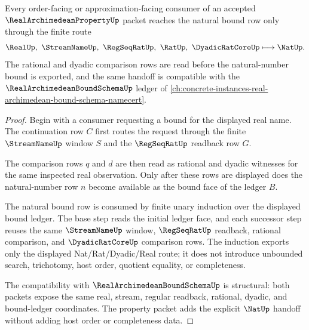 \begin{theorem}
\label{thm:real-archimedean-property-nat-rat-bound-handoff}
Every order-facing or approximation-facing consumer of an accepted $\RealArchimedeanPropertyUp$ packet reaches the natural bound row only through the finite route
$$
\RealUp,\ \StreamNameUp,\ \RegSeqRatUp,\ \RatUp,\ \DyadicRatCoreUp \longmapsto \NatUp.
$$
The rational and dyadic comparison rows are read before the natural-number bound is exported, and the same handoff is compatible with the $\RealArchimedeanBoundSchemaUp$ ledger of \autoref{ch:concrete-instances-real-archimedean-bound-schema-namecert}.
\end{theorem}
\begin{proof}
Begin with a consumer requesting a bound for the displayed real name. The continuation row $C$ first routes the request through the finite $\StreamNameUp$ window $S$ and the $\RegSeqRatUp$ readback row $G$.

The comparison rows $q$ and $d$ are then read as rational and dyadic witnesses for the same inspected real observation. Only after these rows are displayed does the natural-number row $n$ become available as the bound face of the ledger $B$.

The natural bound row is consumed by finite unary induction over the displayed bound ledger. The base step reads the initial ledger face, and each successor step reuses the same $\StreamNameUp$ window, $\RegSeqRatUp$ readback, rational comparison, and $\DyadicRatCoreUp$ comparison rows. The induction exports only the displayed Nat/Rat/Dyadic/Real route; it does not introduce unbounded search, trichotomy, host order, quotient equality, or completeness.

The compatibility with $\RealArchimedeanBoundSchemaUp$ is structural: both packets expose the same real, stream, regular readback, rational, dyadic, and bound-ledger coordinates. The property packet adds the explicit $\NatUp$ handoff without adding host order or completeness data.
\end{proof}

